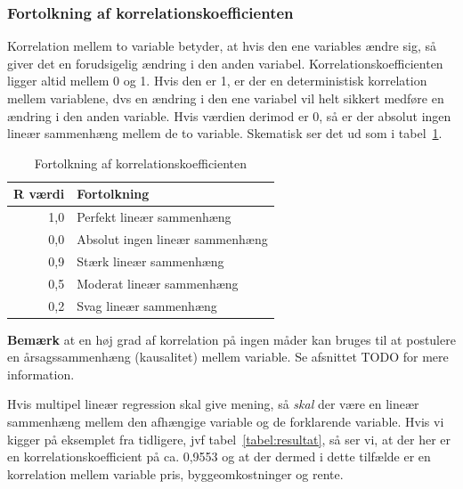 \subsubsection{Fortolkning af korrelationskoefficienten}
Korrelation mellem to variable betyder, at hvis den ene variables ændre sig, så giver det en forudsigelig ændring i den anden variabel. Korrelationskoefficienten ligger altid mellem 0 og 1. Hvis den er 1, er der en deterministisk korrelation mellem variablene, dvs en ændring i den ene variabel vil helt sikkert medføre en ændring i den anden variable. Hvis værdien derimod er 0, så er der absolut ingen lineær sammenhæng mellem de to variable. Skematisk ser det ud som i tabel~\ref{tabel:correlation}.
\begin{table}[h]
\centering
\caption{Fortolkning af korrelationskoefficienten}
\label{tabel:correlation}
\begin{tabular}{|r|l|}
\hline
\multicolumn{1}{|l|}{R værdi} & Fortolkning                     \\ \hline
1,0                           & Perfekt lineær sammenhæng       \\ \hline
0,0                           & Absolut ingen lineær sammenhæng \\ \hline
0,9                           & Stærk lineær sammenhæng         \\ \hline
0,5                           & Moderat lineær sammenhæng       \\ \hline
0,2                           & Svag lineær sammenhæng          \\ \hline
\end{tabular}
\end{table}
\textbf{Bemærk} at en høj grad af korrelation på ingen måder kan bruges til at postulere en årsagssammenhæng (kausalitet) mellem variable. Se afsnittet TODO for mere information.

Hvis multipel lineær regression skal give mening, så \textit{skal} der være en lineær sammenhæng mellem den afhængige variable og de forklarende variable. Hvis vi kigger på eksemplet fra tidligere, jvf tabel~\ref{tabel:resultat}, så ser vi, at der her er en korrelationskoefficient på ca. 0,9553 og at der dermed i dette tilfælde er en korrelation mellem variable pris, byggeomkostninger og rente.

